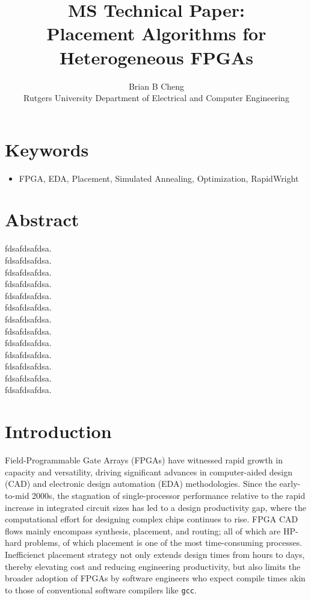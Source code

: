 \documentclass[twocolumn]{article}
\begin{document}
\title{MS Technical Paper: \\ Placement Algorithms for Heterogeneous FPGAs}
\author{Brian B Cheng \\ Rutgers University Department of Electrical and Computer Engineering}


\date{}
\maketitle

\section{Keywords}
\begin{itemize}
    \item FPGA, EDA, Placement, Simulated Annealing, Optimization, RapidWright
\end{itemize}


\section{Abstract}
    fdsafdsafdsa. \\ 
    fdsafdsafdsa. \\ 
    fdsafdsafdsa. \\ 
    fdsafdsafdsa. \\ 
    fdsafdsafdsa. \\ 
    fdsafdsafdsa. \\ 
    fdsafdsafdsa. \\ 
    fdsafdsafdsa. \\ 
    fdsafdsafdsa. \\ 
    fdsafdsafdsa. \\ 
    fdsafdsafdsa. \\ 
    fdsafdsafdsa. \\ 
    fdsafdsafdsa. \\ 

\section{Introduction}

    Field-Programmable Gate Arrays (FPGAs) have witnessed rapid growth in capacity and versatility, driving significant advances in computer-aided design (CAD) and electronic design automation (EDA) methodologies. 
    Since the early-to-mid 2000s, the stagnation of single-processor performance relative to the rapid increase in integrated circuit sizes has led to a design productivity gap, where the computational effort for designing complex chips continues to rise. 
    FPGA CAD flows mainly encompass synthesis, placement, and routing; all of which are HP-hard problems, of which placement is one of the most time-consuming processes. 
    Inefficienct placement strategy not only extends design times from hours to days, thereby elevating cost and reducing engineering productivity, but also limits the broader adoption of FPGAs by software engineers who expect compile times akin to those of conventional software compilers like {\tt gcc}. 
\end{document}
